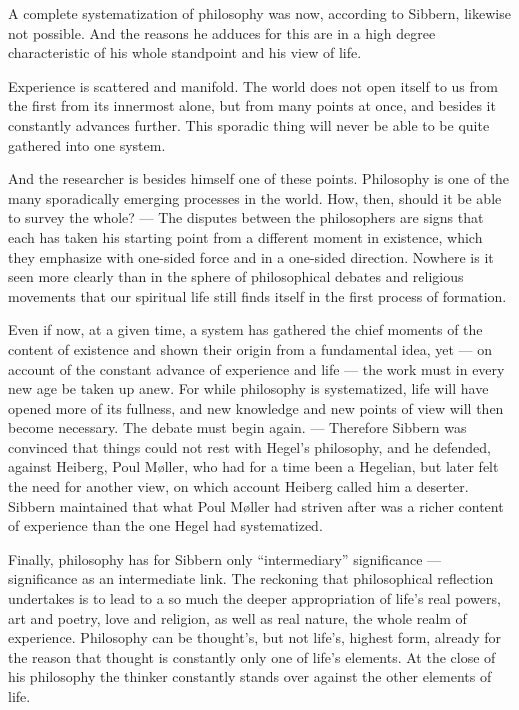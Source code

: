 \documentclass[12pt,a4paper]{book}
\newcommand{\opage}[1]{\marginnote{\footnotesize\textit{[#1]}}}
\begin{document}
A complete systematization of philosophy was now, according to Sibbern, likewise not possible.
And the reasons he adduces for this are in a high degree characteristic of his whole standpoint
and his view of life.

Experience is scattered and manifold. The world does not open itself to us from the first from
its innermost alone, but from many points at once, and besides it constantly advances further.
This sporadic thing will never be able to be quite gathered into one system.

And the researcher is besides himself one of these points. Philosophy is one of the many
sporadically emerging processes in the world. How, then, should it be able to survey the whole?
--- The disputes between the philosophers are signs that each has taken his starting point from a
different moment in existence, which they emphasize with one-sided force and in a one-sided
direction. Nowhere is it seen more clearly than in the sphere of philosophical debates and
religious movements that our spiritual life still finds itself in the first process of formation.

Even if now, at a given time, a system has gathered the chief moments of the content of existence
and shown their origin from a fundamental idea, yet --- on account of the constant advance of
experience and life --- the work must in every new age be taken up anew. For while philosophy is
systematized, life will have opened more of its fullness, and new knowledge and new points of
view will then become necessary. The debate must \opage{112}begin again. --- Therefore Sibbern was convinced
that things could not rest with Hegel's philosophy, and he defended, against Heiberg, Poul Møller,
who had for a time been a Hegelian, but later felt the need for another view, on which account
Heiberg called him a deserter. Sibbern maintained that what Poul Møller had striven after was a
richer content of experience than the one Hegel had systematized.

Finally, philosophy has for Sibbern only ``intermediary'' significance --- significance as an
intermediate link. The reckoning that philosophical reflection undertakes is to lead to a so much
the deeper appropriation of life's real powers, art and poetry, love and religion, as well as
real nature, the whole realm of experience. Philosophy can be thought's, but not life's, highest
form, already for the reason that thought is constantly only one of life's elements. At the close
of his philosophy the thinker constantly stands over against the other elements of life.
\end{document}
